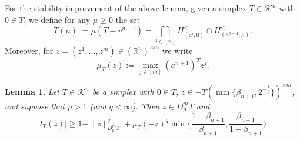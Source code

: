 \documentclass{amsart}
\newtheorem{lemma}[theorem]{Lemma}
\newcommand\R{\mathbb{R}}
\newcommand\CK{\mathcal{K}}
\newcommand{\diff}[3]{D_{#1}^{#2} #3}
\newcommand{\interval}[4]{I_{#3} (#4)}
\newcommand{\simplexscale}[2]{#1(#2)}
\newcommand{\simplexscaling}[2]{\mu_{#1}(#2)}
\newcommand{\cartesian}[2]{#1^{\times #2}}
\begin{document}
For the stability improvement of the above lemma,
given a simplex $T \in \CK^n$ with $0 \in T$,
we define for any $\mu \geq 0$ the set
\[
	\simplexscale{T}{\mu}
	:= \mu (T - v^{n+1})
    = \bigcap_{i \in [n]} H_{(a^i,0)}^\leq \cap H_{(a^{n+1},\mu)}^\leq.
\]
Moreover, for $z = (z^1, \dots, z^m) \in \cartesian{(\R^n)}{m}$ we write
\[
	\simplexscaling{T}{z}
	:= \max_{j \in [m]} (a^{n+1})^T z^j.
\]



\begin{lemma}\label{lem:simplex_iz}
Let $T \in \CK^n$ be a simplex with $0 \in T$,
$z \in - \cartesian{\simplexscale{T}{\min \{ \beta_{n+1}, 2^{-\frac{1}{q}} \}}}{m}$,
and suppose that $p > 1$ (and $q < \infty$).
Then $z \in \diff{p}{m}{T}$ and
\[
    |\interval{p}{m}{T}{z}|
	\geq 1 - \|z\|_{\diff{p}{m}{T}}^q + \simplexscaling{T}{-z}^q \min \bigg\{ \frac{1-\beta_{n+1}}{\beta_{n+1}}, \frac{\beta_{n+1}}{1-\beta_{n+1}} \bigg\}.
\]
\end{lemma}
\end{document}
